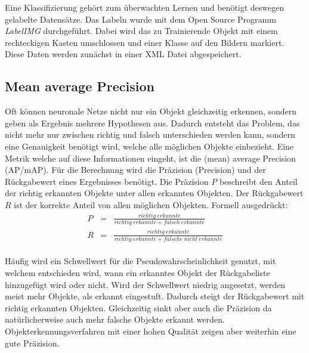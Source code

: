 \documentclass[a4paper,12pt,oneside]{article}
\begin{document}
Eine Klassifizierung gehört zum überwachten Lernen und benötigt deswegen gelabelte Datensätze. Das Labeln wurde mit dem Open Source Programm \textit{LabelIMG} \cite{labelimg2019} durchgeführt. Dabei wird das zu Trainierende Objekt mit einem rechteckigen Kasten umschlossen und einer Klasse auf den Bildern markiert. Diese Daten werden zunächst in einer XML Datei abgespeichert. 
  \subsection{Mean average Precision}\label{s.map}
Oft können neuronale Netze nicht nur ein Objekt gleichzeitig erkennen, sondern geben als Ergebnis mehrere Hypothesen aus. Dadurch entsteht das Problem, das nicht mehr nur zwischen richtig und falsch unterschieden werden kann, sondern eine Genauigkeit benötigt wird, welche alle möglichen Objekte einbezieht. Eine Metrik welche auf diese Informationen eingeht, ist die (mean) average Precision (AP/mAP). Für die Berechnung wird die Präzision (Precision) und der Rückgabewert eines Ergebnisses benötigt. Die Präzision $P$ beschreibt den Anteil der richtig erkannten Objekte unter allen erkannten Objekten. Der Rückgabewert $R$ ist der korrekte Anteil von allen möglichen Objekten. Formell ausgedrückt:\\
\begin{eqnarray}
P&=&\frac{richtig\medspace erkannte}{richtig\medspace erkannte + falsch\medspace erkannte}\\
R&=&\frac{richtig\medspace erkannte}{richtig\medspace erkannte + falsche\medspace nicht\medspace erkannte}
\end{eqnarray}\\
Häufig wird ein Schwellwert für die Pseudowahrscheinlichkeit genutzt, mit welchem entschieden wird, wann ein erkanntes Objekt der Rückgabeliste hinzugefügt wird oder nicht. Wird der Schwellwert niedrig angesetzt, werden meist mehr Objekte, als erkannt eingestuft. Dadurch steigt der Rückgabewert mit richtig erkannten Objekten. Gleichzeitig sinkt aber auch die Präzision da natürlicherweise auch mehr falsche Objekte erkannt werden. Objekterkennungsverfahren mit einer hohen Qualität zeigen aber weiterhin eine gute Präzision.
\end{document}
